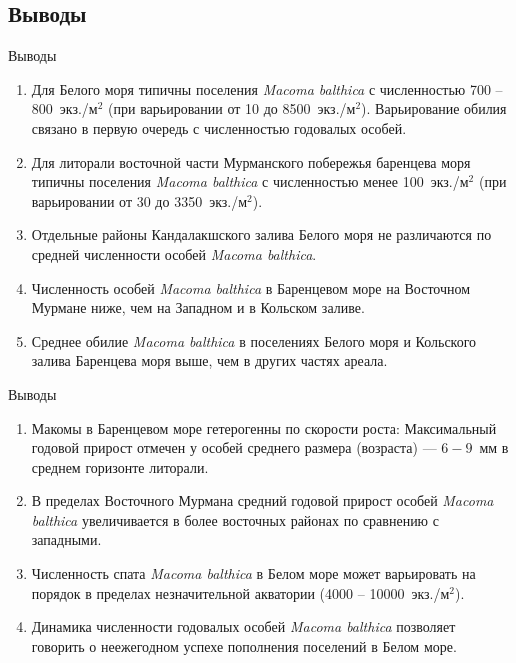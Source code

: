 \documentclass{beamer}
\begin{document}
\begin{small}
		\section{Выводы}
\begin{frame}{Выводы}
	\begin{enumerate}
		\item Для Белого моря типичны поселения {\it Macoma balthica} с численностью  700 -- 800~экз./м$^2$ (при варьировании от 10 до 8500~экз./м$^2$). Варьирование обилия связано в первую очередь с численностью годовалых особей.
		\item Для литорали восточной части Мурманского побережья баренцева моря типичны поселения {\it Macoma balthica} с численностью  менее 100~экз./м$^2$ (при варьировании от 30 до 3350~экз./м$^2$).
		\item Отдельные районы Кандалакшского залива Белого моря не различаются по средней численности особей {\it Macoma balthica}.
		\item Численность особей {\it Macoma balthica} в Баренцевом море на Восточном Мурмане ниже, чем на Западном и в Кольском заливе.
		\item Среднее обилие {\it Macoma balthica} в поселениях Белого моря и Кольского залива Баренцева моря выше, чем в других частях ареала. 
	\end{enumerate}
\end{frame}

\begin{frame}{Выводы}
	\begin{enumerate}
\addtocounter{enumi}{5}
		\item Макомы в Баренцевом море гетерогенны по скорости роста: Максимальный годовой прирост отмечен у особей среднего размера (возраста) --- $6 - 9$~мм в среднем горизонте литорали.
		\item В пределах Восточного Мурмана средний годовой прирост особей {\it Macoma balthica} увеличивается в более восточных районах по сравнению с западными.
		\item Численность спата {\it Macoma balthica} в Белом море может варьировать на порядок в пределах незначительной акватории (4000 -- 10000~экз./м$^2$).
		\item Динамика численности годовалых особей {\it Macoma balthica} позволяет говорить о неежегодном успехе пополнения поселений в Белом море.
	\end{enumerate}
\end{frame}
		

\end{small}
\end{document}
